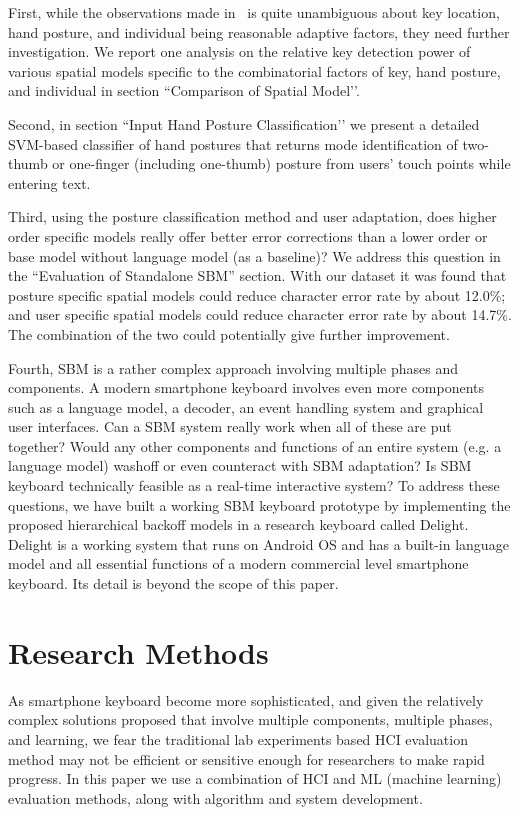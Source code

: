 \documentclass{sigchi}
\begin{document}
First, while the observations made in~\cite{Azenkot:2012} is quite unambiguous about key location, hand posture, and individual being reasonable adaptive factors, they need further investigation.  We report one analysis on the relative key detection power of various spatial models specific to the combinatorial factors of key, hand posture,  and individual in section ``Comparison of Spatial Model’’.

Second, in section ``Input Hand Posture Classification’’ we present a detailed SVM-based classifier of hand postures that returns mode identification of two-thumb or one-finger (including one-thumb) posture from users’ touch points while entering text.

Third, using the posture classification method and user adaptation, does higher order specific models really offer better error corrections than a lower order or base model without language model (as a baseline)? We address this question in the ``Evaluation of Standalone SBM” section. With our dataset it was found that posture specific spatial models could reduce character error rate by about 12.0\%; and user specific spatial models could reduce character error rate by about 14.7\%. The combination of the two could potentially give further improvement. 

Fourth, SBM is a rather complex approach involving multiple phases and components. A modern smartphone keyboard involves even more components such as a language model, a decoder, an event handling system and graphical user interfaces.  Can a SBM system really work when all of these are put together? Would any other components and functions of an entire system (e.g. a language model) washoff or even counteract with SBM adaptation? Is SBM keyboard technically feasible as a real-time interactive system? To address these questions, we have built a working SBM keyboard prototype by implementing the proposed hierarchical backoff models in a research keyboard called Delight. Delight is a working system that runs on Android OS and has a built-in language model and all essential functions of a modern commercial level smartphone keyboard. Its detail is beyond the scope of this paper.

\section{Research Methods}
As smartphone keyboard become more sophisticated, and given the relatively complex solutions proposed that involve multiple components, multiple phases, and learning,  we fear the traditional lab experiments based HCI evaluation method may not be efficient or sensitive enough for researchers to make rapid progress. In this paper we use a combination of HCI and ML (machine learning) evaluation methods, along with algorithm and system development. 
\end{document}
